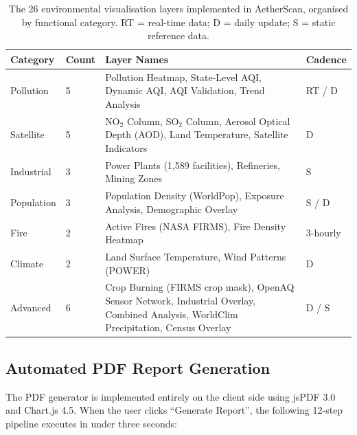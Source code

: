 \documentclass[12pt,a4paper]{article}
\begin{document}
\begin{table}[H]
\centering
\caption[Environmental visualisation layers by category]{%
The 26 environmental visualisation layers implemented in AetherScan,
organised by functional category. RT = real-time data; D = daily update;
S = static reference data.}
\label{tab:layers}
\begin{tabularx}{\textwidth}{@{}llXl@{}}
\toprule
\textbf{Category} & \textbf{Count} & \textbf{Layer Names} & \textbf{Cadence} \\
\midrule
Pollution & 5 &
  Pollution Heatmap, State-Level AQI, Dynamic AQI, AQI Validation,
  Trend Analysis & RT / D \\
Satellite & 5 &
  NO$_2$ Column, SO$_2$ Column, Aerosol Optical Depth (AOD),
  Land Temperature, Satellite Indicators & D \\
Industrial & 3 &
  Power Plants (1,589 facilities), Refineries, Mining Zones & S \\
Population & 3 &
  Population Density (WorldPop), Exposure Analysis, Demographic Overlay & S / D \\
Fire & 2 &
  Active Fires (NASA FIRMS), Fire Density Heatmap & 3-hourly \\
Climate & 2 &
  Land Surface Temperature, Wind Patterns (POWER) & D \\
Advanced & 6 &
  Crop Burning (FIRMS crop mask), OpenAQ Sensor Network,
  Industrial Overlay, Combined Analysis,
  WorldClim Precipitation, Census Overlay & D / S \\
\bottomrule
\end{tabularx}
\end{table}

\subsection{Automated PDF Report Generation}
\label{sec:impl:pdf}

The PDF generator is implemented entirely on the client side using jsPDF 3.0
and Chart.js 4.5. When the user clicks ``Generate Report'', the following
12-step pipeline executes in under three seconds:
\end{document}
